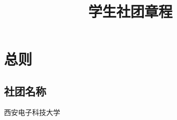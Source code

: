\documentclass[UTF8]{ctexart}
\title{学生社团章程}
\begin{document}
\maketitle
\section{总则}
\subsection{社团名称}西安电子科技大学
\end{document}

